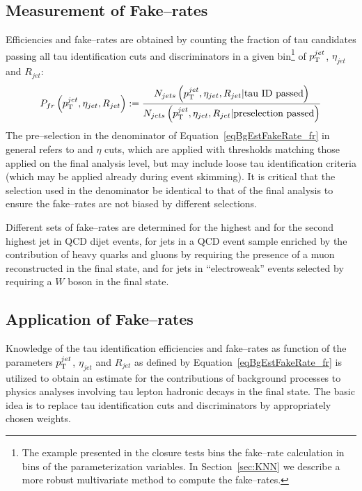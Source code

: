 \subsection{Measurement of Fake--rates}
%
Efficiencies and fake--rates are obtained by counting the fraction of tau
candidates passing all tau identification cuts and discriminators in a given
bin\footnote{The example presented in the closure tests bins the fake--rate
calculation in bins of the parameterization variables.  In Section~\ref{sec:KNN}
we describe a more robust multivariate method to compute the fake--rates.} of
$p_{\mathrm{T}}^{jet}$, $\eta_{jet}$ and $R_{jet}$:
\begin{equation}
P_{fr} \left( p_{\mathrm{T}}^{jet}, \eta_{jet}, R_{jet} \right) := 
  \frac{N_{jets} \left( p_{\mathrm{T}}^{jet}, \eta_{jet}, R_{jet} \vert \mbox{tau ID passed} \right)}
       {N_{jets} \left( p_{\mathrm{T}}^{jet}, \eta_{jet}, R_{jet} \vert \mbox{preselection passed} \right)}
\label{eqBgEstFakeRate_fr}
\end{equation}
The pre--selection in the denominator of Equation~\ref{eqBgEstFakeRate_fr} in
general refers to \pt and $\eta$ cuts, which are applied with thresholds
matching those applied on the final analysis level, but may include
loose tau identification criteria (which may be applied \eg already during event
skimming).  It is critical that the selection used in the denominator be
identical to that of the final analysis to ensure the fake--rates are not biased
by different selections.

Different sets of fake--rates are determined for the highest \pt and for the
second highest \pt jet in QCD dijet events, for jets in a QCD event sample
enriched by the contribution of heavy quarks and gluons by requiring the
presence of a muon reconstructed in the final state, and for jets in
``electroweak'' events selected by requiring a $W$ boson in the final state.

\subsection{Application of Fake--rates}
\label{sec:FakeRateApplication}
%
Knowledge of the tau identification efficiencies and fake--rates as function of
the parameters $p_{\mathrm{T}}^{jet}$, $\eta_{jet}$ and $R_{jet}$ as defined by
Equation~\ref{eqBgEstFakeRate_fr} is utilized to obtain an estimate for the
contributions of background processes to physics analyses involving tau lepton
hadronic decays in the final state.  The basic idea is to replace tau
identification cuts and discriminators by appropriately chosen weights.

